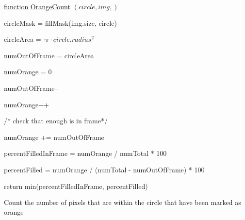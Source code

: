 \documentclass[conference]{IEEEtran}
\begin{document}
\begin{algorithm} 

    \underline{function OrangeCount} $(circle, img,)$\;
    
        
    circleMask = fillMask(img.size, circle)
    
    circleArea = $  \cdot \pi \cdot circle.radius^2$
    
    numOutOfFrame = circleArea
   
    numOrange = 0
    
    
    {
	 {
	 	numOutOfFrame--
		
		{
			numOrange++
		}
	 }
    }
    
    /* check that enough is in frame*/
    
     {
	numOrange += numOutOfFrame
    }
    
    percentFilledInFrame = numOrange / numTotal * 100
    
    percentFilled = numOrange / (numTotal - numOutOfFrame) * 100
    
    return min(percentFilledInFrame, percentFilled)
    
    
    \caption{Count the number of pixels that are within the circle that have been marked as orange} \label{OrangeCountAlg}
\end{algorithm}










\vspace{12pt}
\end{document}
